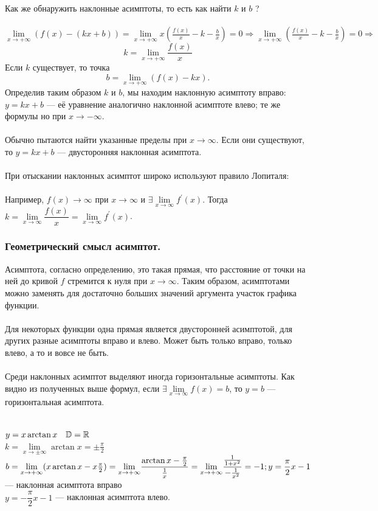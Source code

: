 Как же обнаружить наклонные асимптоты, то есть как найти $k$ и $b$ ?\\\\
$\underset{x \rightarrow +\infty}{\lim}{(f(x)-(kx+b))} = \underset{x \rightarrow +\infty}{\lim}{x(\frac{f(x)}{x}-k - \frac{b}{x})} = 0
\Rightarrow \underset{x \rightarrow +\infty}{\lim}{(\frac{f(x)}{x} - k - \frac{b}{x})} = 0 \Rightarrow$  $$\boxed{k = \underset{x \rightarrow +\infty}{\lim}{\frac{f(x)}{x}}}$$
Если $k$ существует, то точка $$\boxed{b = \underset{x \rightarrow +\infty}{\lim}{(f(x) - kx)}}.$$
Определив таким образом $k$ и $b$, мы находим наклонную асимптоту вправо: $y = kx+ b$ --- её уравнение аналогично наклонной асимптоте влево; те же формулы но при $x \rightarrow -\infty$.\\\\
Обычно пытаются найти указанные  пределы при $x \rightarrow \infty$. Если они существуют, то $y = kx +b$ --- двусторонняя наклонная асимптота.\\\\
При отыскании наклонных асимптот широко используют правило Лопиталя:\\\\
Например, $f(x) \rightarrow \infty$  при $x \rightarrow \infty$ и $\exists\underset{x \rightarrow \infty}{\lim}{f^{'}(x)}$.
Тогда $k = \underset{x \rightarrow \infty}{\lim}{\dfrac{f(x)}{x}} = \underset{x \rightarrow \infty}{\lim}{f^{'}(x)}$.
\subsubsection{Геометрический смысл асимптот.}
Асимптота, согласно определению, это такая прямая, что расстояние от точки на ней до кривой $f$ стремится к нуля при $x \rightarrow \infty$. Таким образом, асимптотами можно заменять для достаточно больших значений аргумента участок графика функции.\\\\
Для некоторых функции одна прямая является двусторонней асимптотой, для других разные асимптоты вправо и влево. Может быть только вправо, только влево, а то и вовсе не быть.\\\\
Среди наклонных асимптот выделяют иногда горизонтальные асимптоты. Как видно из полученных выше формул, если 
$\exists \underset{x \rightarrow \infty}{\lim}{f(x)} = b$, то $ y = b$ --- горизонтальная асимптота.\\
\begin{example}\\
	$y = x \arctan{x} \quad \mathbb{D} = \mathbb{R}$\\
	$k = \underset{x \rightarrow \pm\infty}{\lim}{\arctan{x}} = \pm \frac{\pi}{2}$\\
	$b = \underset{x \rightarrow +\infty}{\lim}{(x\arctan{x} - x \frac{\pi}{2})} = \underset{x \rightarrow +\infty}{\lim}{\dfrac{\arctan{x} - \frac{\pi}{2}}{\frac{1}{x}}} = \underset{x \rightarrow +\infty}{\lim}{\dfrac{\frac{1}{1+x^2}}{-\frac{1}{x^2}}} = -1;\\\\
	y = \dfrac{\pi}{2}x -1$ --- наклонная асимптота вправо\\
	$y = -\dfrac{\pi}{2}x-1$ --- наклонная асимптота влево.
\end{example}
